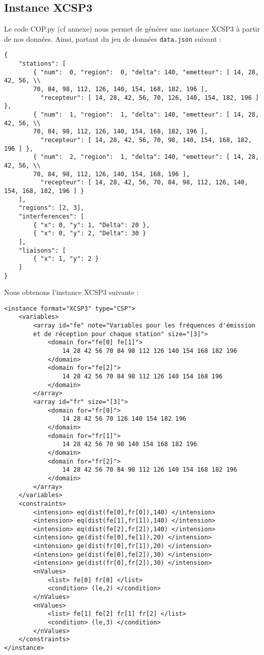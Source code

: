 \documentclass[12pt]{article}
\begin{document}
\subsection{Instance XCSP3}

Le code COP.py (cf annexe) nous permet de générer une instance XCSP3 à partir de nos données. Ainsi, partant du jeu de données \texttt{data.json} suivant : 
\begin{verbatim}
{
    "stations": [
        { "num":  0, "region":  0, "delta": 140, "emetteur": [ 14, 28, 42, 56, \\
        70, 84, 98, 112, 126, 140, 154, 168, 182, 196 ], 
          "recepteur": [ 14, 28, 42, 56, 70, 126, 140, 154, 182, 196 ] },
        { "num":  1, "region":  1, "delta": 140, "emetteur": [ 14, 28, 42, 56, \\
        70, 84, 98, 112, 126, 140, 154, 168, 182, 196 ], 
          "recepteur": [ 14, 28, 42, 56, 70, 98, 140, 154, 168, 182, 196 ] },
        { "num":  2, "region":  1, "delta": 140, "emetteur": [ 14, 28, 42, 56, \\
        70, 84, 98, 112, 126, 140, 154, 168, 196 ], 
          "recepteur": [ 14, 28, 42, 56, 70, 84, 98, 112, 126, 140, 154, 168, 182, 196 ] }
    ],
    "regions": [2, 3],
    "interferences": [
        { "x": 0, "y": 1, "Delta": 20 },
        { "x": 0, "y": 2, "Delta": 30 }
    ],
    "liaisons": [
        { "x": 1, "y": 2 }
    ]
}
\end{verbatim}

Nous obtenons l'instance XCSP3 suivante : 
\begin{verbatim}
<instance format="XCSP3" type="CSP">
    <variables>
        <array id="fe" note="Variables pour les fréquences d'émission 
        et de réception pour chaque station" size="[3]">
            <domain for="fe[0] fe[1]"> 
                14 28 42 56 70 84 98 112 126 140 154 168 182 196 
            </domain>
            <domain for="fe[2]"> 
                14 28 42 56 70 84 98 112 126 140 154 168 196 
            </domain>
        </array>
        <array id="fr" size="[3]">
            <domain for="fr[0]"> 
                14 28 42 56 70 126 140 154 182 196 
            </domain>
            <domain for="fr[1]"> 
                14 28 42 56 70 98 140 154 168 182 196 
            </domain>
            <domain for="fr[2]"> 
                14 28 42 56 70 84 98 112 126 140 154 168 182 196 
            </domain>
        </array>
    </variables>
    <constraints>
        <intension> eq(dist(fe[0],fr[0]),140) </intension>
        <intension> eq(dist(fe[1],fr[1]),140) </intension>
        <intension> eq(dist(fe[2],fr[2]),140) </intension>
        <intension> ge(dist(fe[0],fe[1]),20) </intension>
        <intension> ge(dist(fr[0],fr[1]),20) </intension>
        <intension> ge(dist(fe[0],fe[2]),30) </intension>
        <intension> ge(dist(fr[0],fr[2]),30) </intension>
        <nValues>
            <list> fe[0] fr[0] </list>
            <condition> (le,2) </condition>
        </nValues>
        <nValues>
            <list> fe[1] fe[2] fr[1] fr[2] </list>
            <condition> (le,3) </condition>
        </nValues>
    </constraints>
</instance>
\end{verbatim}
\end{document}
